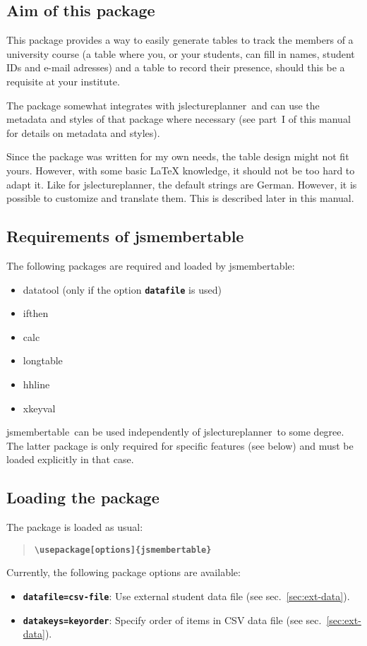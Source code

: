 \documentclass[english]{article}
\newcommand*\jmacro[1]{\textbf{\texttt{#1}}}
\newcommand*\jcsmacro[1]{\jmacro{\textbackslash{#1}}}
\newcommand*\joption[1]{\textbf{\texttt{#1}}}
\newcommand*\jparam[1]{\angus #1\angud}
\newcommand*\jslp{\textsf{jslectureplanner}}
\newcommand*\jsmt{\textsf{jsmembertable}}
\begin{document}
\subsection{Aim of this package}

This package provides a way to easily generate tables to track the members of a
university course (a table where you, or your students, can fill in names,
student IDs and e-mail adresses) and a table to record their presence,
should this be a requisite at your institute.

The package somewhat integrates with \jslp\ and can use the
metadata and styles of that package where necessary (see part~I of this
manual for details on metadata and styles).

Since the package was written for my own needs, the table design might not fit yours.
However, with some basic LaTeX knowledge, it should not be too hard to adapt it.
Like for \jslp, the default strings are German.
However, it is possible to customize and translate them.
This is described later in this manual.


\subsection{Requirements of \jsmt}\label{sec:req-jsmt} 

The following packages are required and loaded by \jsmt: 
\begin{itemize}
 \setlength\itemsep{2pt}
 \item \textsf{datatool} (only if the option \joption{datafile} is used)
 \item \textsf{ifthen}
 \item \textsf{calc}
 \item \textsf{longtable}
 \item \textsf{hhline}
 \item \textsf{xkeyval}
\end{itemize}
\jsmt\ can be used independently of
\jslp\ to some degree. The latter package is only required for specific
features (see below) and must be loaded explicitly in that case.

\subsection{Loading the package}

The package is loaded as usual:
\begin{quote}
\jcsmacro{usepackage[\jparam{options}]\{jsmembertable\}}
\end{quote}
Currently, the following package options are available:
\begin{itemize}
 \item \joption{datafile=\jparam{csv-file}}: Use external student data file (see sec.~\ref{sec:ext-data}).
 \item \joption{datakeys=\jparam{keyorder}}: Specify order of items in CSV data file (see sec.~\ref{sec:ext-data}).
\end{itemize}
\end{document}
